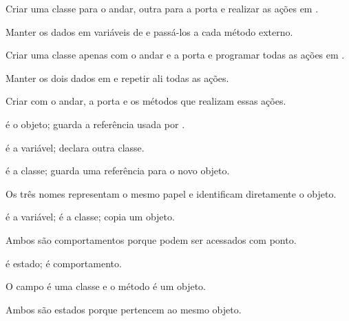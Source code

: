 \documentclass[11pt,a4paper]{article}
\begin{document}
\noindent\begin{minipage}[t]{.485\textwidth}
\begin{alternativas}
\item Criar uma classe para o andar, outra para a porta e realizar as ações em .
\item Manter os dados em variáveis de  e passá-los a cada método externo.
\item Criar uma classe apenas com o andar e a porta e programar todas as ações em .
\item Manter os dois dados em  e repetir ali todas as ações.
\item Criar  com o andar, a porta e os métodos que realizam essas ações.
\end{alternativas}
\begin{alternativas}
\item {} é o objeto;  guarda a referência usada por .
\item {} é a variável;  declara outra classe.
\item {} é a classe;  guarda uma referência para o novo objeto.
\item Os três nomes representam o mesmo papel e identificam diretamente o objeto.
\item {} é a variável;  é a classe;  copia um objeto.
\end{alternativas}
\begin{alternativas}
\item Ambos são comportamentos porque podem ser acessados com ponto.
\item {} é estado;  é comportamento.
\item O campo é uma classe e o método é um objeto.
\item Ambos são estados porque pertencem ao mesmo objeto.

\end{alternativas}
\end{minipage}
\end{document}
